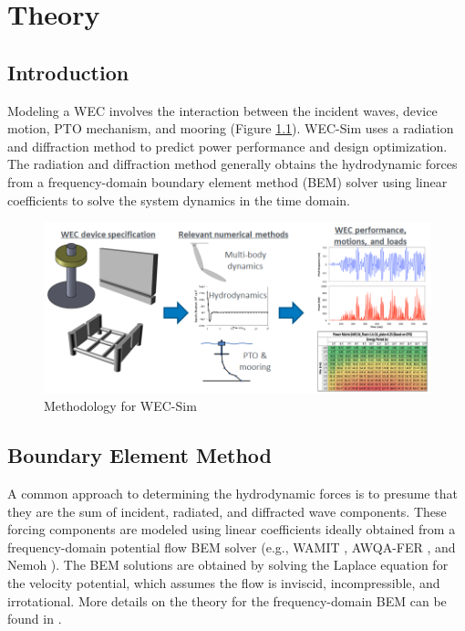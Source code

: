 \chapter{Theory}
\section{Introduction}
\noindent  Modeling a WEC involves the interaction
between the incident waves, device motion, PTO mechanism,
and mooring (Figure \ref{fig:physics}). WEC-Sim uses a radiation and
diffraction method \cite{li2012synthesis,Babarit2012b} to predict
power performance and design optimization. The radiation and diffraction
method generally obtains the hydrodynamic forces from a frequency-domain
boundary element method (BEM) solver using linear coefficients to solve
the system dynamics in the time domain. \\

\begin{figure}[H]
\begin{centering}
\includegraphics[scale=0.65]{theoryManual/Figures/Physics}
\end{centering}
\noindent \centering{}\protect\caption{Methodology for WEC-Sim\label{fig:physics}}
\end{figure}

\section{\noindent Boundary Element Method}
\noindent A common approach to determining the hydrodynamic forces is
to presume that they are the sum of incident, radiated, and diffracted wave components.
These forcing components are modeled using linear coefficients ideally obtained from a frequency-domain potential flow BEM solver (e.g., WAMIT \cite{Lee2006}, AWQA-FER \cite{_aqwa_}, and Nemoh
\cite{Nemoh2014}). The BEM solutions are obtained by solving the
Laplace equation for the velocity potential, which assumes the flow
is inviscid, incompressible, and irrotational. More details on the
theory for the frequency-domain BEM can be found in \cite{Lee2006}.

